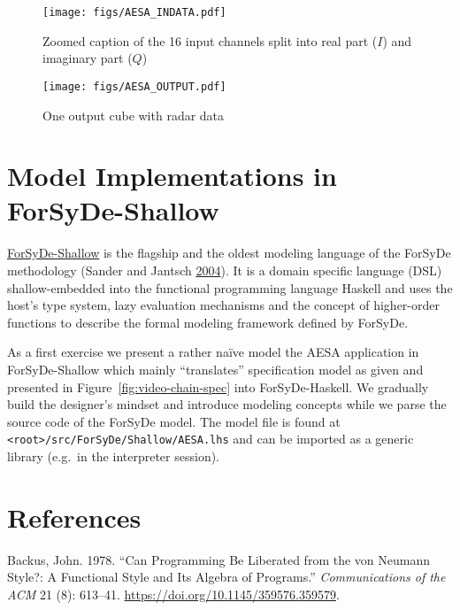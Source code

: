 \documentclass[
  a4paper,
]{article}
\begin{document}
\begin{figure}
\hypertarget{fig:aesa-indata}{%
\centering
\texttt{[image: figs/AESA\_INDATA.pdf]}
\caption{Zoomed caption of the 16 input channels split into real part
(\(I\)) and imaginary part (\(Q\))}\label{fig:aesa-indata}
}
\end{figure}

\begin{figure}
\hypertarget{fig:aesa-odata-atom}{%
\centering
\texttt{[image: figs/AESA\_OUTPUT.pdf]}
\caption{One output cube with radar data}\label{fig:aesa-odata-atom}
}
\end{figure}

\clearpage

\hypertarget{sec:shallow}{%
\section{Model Implementations in ForSyDe-Shallow}\label{sec:shallow}}

\href{https://forsyde.github.io/forsyde-shallow/}{ForSyDe-Shallow} is
the flagship and the oldest modeling language of the ForSyDe methodology
(Sander and Jantsch \protect\hyperlink{ref-sander-2004}{2004}). It is a
domain specific language (DSL) shallow-embedded into the functional
programming language Haskell and uses the host's type system, lazy
evaluation mechanisms and the concept of higher-order functions to
describe the formal modeling framework defined by ForSyDe.

As a first exercise we present a rather naïve model the AESA application
in ForSyDe-Shallow which mainly ``translates'' specification model as
given and presented in Figure~\ref{fig:video-chain-spec} into
ForSyDe-Haskell. We gradually build the designer's mindset and introduce
modeling concepts while we parse the source code of the ForSyDe model.
The model file is found at
\texttt{\textless{}root\textgreater{}/src/ForSyDe/Shallow/AESA.lhs} and
can be imported as a generic library (e.g.~in the interpreter session).

\hypertarget{references}{%
\section*{References}\label{references}}

\hypertarget{refs}{}
\leavevmode\hypertarget{ref-backus-1978}{}%
Backus, John. 1978. ``Can Programming Be Liberated from the von Neumann
Style?: A Functional Style and Its Algebra of Programs.''
\emph{Communications of the ACM} 21 (8): 613--41.
\url{https://doi.org/10.1145/359576.359579}.
\end{document}
